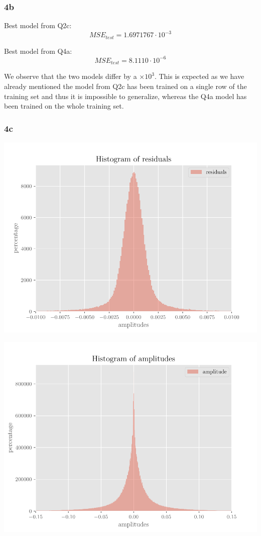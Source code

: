 \documentclass{article}
\begin{document}
\subsubsection{4b}

Best model from Q2c: 
$$ MSE_{test} = 1.6971767 \cdot 10^{-3} $$

Best model from Q4a:
$$ MSE_{test} = 8.1110 \cdot 10^{-6} $$

We observe that the two models differ by a $\times 10^3$. This is expected as we have already mentioned the model from Q2c has been trained on a single row of the training set and thus it is impossible to generalize, whereas the Q4a model has been trained on the whole training set.  

\subsubsection{4c}

\includegraphics[scale=0.75]{fig_04.pdf}

\includegraphics[scale=0.75]{fig_05.pdf}
\end{document}
